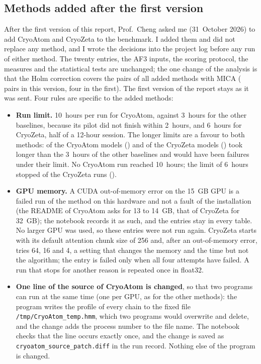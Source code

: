 \subsection{Methods added after the first version}\label{sec:added}
After the first version of this report, Prof.\ Cheng asked me (31~October 2026) to add CryoAtom and CryoZeta to the benchmark. I added them and did not replace any method, and I wrote the decisions into the project log before any run of either method. The twenty entries, the AF3 inputs, the scoring protocol, the measures and the statistical tests are unchanged; the one change of the analysis is that the Holm correction covers the pairs of all added methods with MICA (\NFamilyWord{} pairs in this version, four in the first). The first version of the report stays as it was sent. Four rules are specific to the added methods:
\begin{itemize}
\item \textbf{Run limit.} 10~hours per run for CryoAtom, against 3~hours for the other baselines, because its pilot did not finish within 2~hours, and 6~hours for CryoZeta, half of a 12-hour session. The longer limits are a favour to both methods: \NOverThreeHCryoatom{} of the CryoAtom models (\OverThreeHListCryoatom{}) and \NOverThreeHCryozeta{} of the CryoZeta models (\OverThreeHListCryozeta{}) took longer than the 3~hours of the other baselines and would have been failures under their limit. No CryoAtom run reached 10~hours; the limit of 6~hours stopped \FailTimeoutCryozeta{} of the CryoZeta runs (\FailTimeoutListCryozeta{}).
\item \textbf{GPU memory.} A CUDA out-of-memory error on the 15~GB GPU is a failed run of the method on this hardware and not a fault of the installation (the README of CryoAtom asks for 13 to 14~GB, that of CryoZeta for 32~GB); the notebook records it as such, and the entries stay in every table. No larger GPU was used, so these entries were not run again. CryoZeta starts with its default attention chunk size of 256 and, after an out-of-memory error, tries 64, 16 and 4, a setting that changes the memory and the time but not the algorithm; the entry is failed only when all four attempts have failed. A run that stops for another reason is repeated once in float32.
\item \textbf{One line of the source of CryoAtom is changed}, so that two programs can run at the same time (one per GPU, as for the other methods): the program writes the profile of every chain to the fixed file \texttt{/tmp/CryoAtom\_temp.hmm}, which two programs would overwrite and delete, and the change adds the process number to the file name. The notebook checks that the line occurs exactly once, and the change is saved as \texttt{cryoatom\_source\_patch.diff} in the run record. Nothing else of the program is changed.

\end{itemize}
